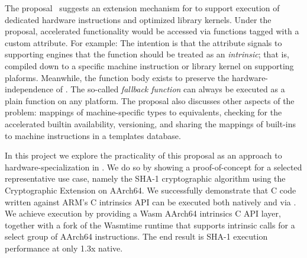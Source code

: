 The  proposal~\cite{hw-spec-wasm} suggests an extension
mechanism for \wasm to support execution of dedicated hardware instructions and
optimized library kernels. Under the proposal, accelerated functionality would
be accessed via functions tagged with a custom  attribute. For
example: 
%
%
The intention is that the attribute signals to supporting engines that the
function should be treated as an \emph{intrinsic}; that is, compiled down to a
specific machine instruction or library kernel on supporting plaforms.
Meanwhile, the function body exists to preserve the hardware-independence of
\wasm. The so-called \emph{fallback function} can always be executed as a plain
\wasm function on any platform. The proposal also discusses other aspects of the
problem: mappings of machine-specific types to \wasm equivalents, checking for
the accelerated builtin availability, versioning, and sharing the mappings of
built-ins to machine instructions in a templates database.


In this project we explore the practicality of this proposal as an approach to
hardware-specialization in \wasm. We do so by showing a proof-of-concept for a
selected representative use case, namely the SHA-1 cryptographic algorithm using
the Cryptographic Extension on AArch64. We successfully demonstrate that C code
written against ARM's C intrinsics API can be executed both natively and via
\wasm. We achieve \wasm execution by providing a Wasm AArch64 intrinsics C API
layer, together with a fork of the Wasmtime \wasm runtime that supports
intrinsic calls for a select group of AArch64 instructions. The end result is
SHA-1 execution performance at only 1.3x native.
